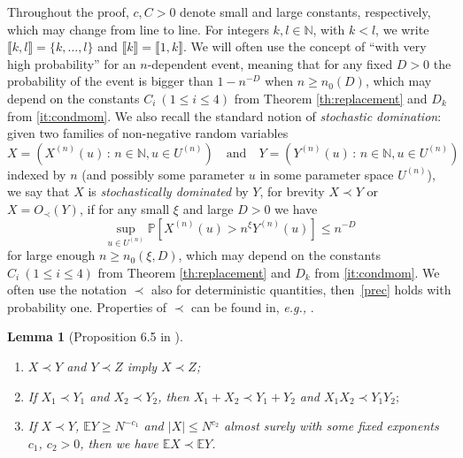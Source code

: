\documentclass[10pt,reqno]{amsart}
\numberwithin{equation}{section}
\numberwithin{figure}{section}
\theoremstyle{plain}
\newtheorem{lemma}[theorem]{Lemma}
\newcommand{\N}{{\mathbb{N}}}
\newcommand{\<}{\langle}
\renewcommand{\>}{\rangle}
\newcommand{\E}{\mathbb{E}}
\newcommand{\eg}{\emph{e.g., }}
\begin{document}
Throughout the proof, $c,C>0$ denote small and large constants, respectively, which may change from line to line.  For integers $k,l\in\N$, with $k<l$, we write 
$\llbracket k,l \rrbracket= \{k,\dots, l\}$ and 
$\llbracket k \rrbracket=
\llbracket 1,k \rrbracket$.  
We will often use the concept of ``with very high probability'' for an $n$-dependent event, meaning that for any fixed $D>0$ the probability of the event is bigger than $1-n^{-D}$ when $n\ge n_0(D)$, which may depend on the constants $C_i~(1\leq i\leq 4)$ from Theorem \ref{th:replacement} and $D_k$ from \ref{it:condmom}. We also recall the standard notion of \emph{stochastic domination}:  
given two families of non-negative random variables
\[
X=\left(X^{(n)}(u) \,:\, n\in\N, u\in U^{(n)}\right)\quad\text{and}\quad Y=\left(Y^{(n)}(u) \,:\, n\in\N, u\in U^{(n)}\right)
\] 
indexed by $n$ (and possibly some parameter $u$  in some parameter space $U^{(n)}$), 
we say that $X$ is {\it stochastically dominated} by $Y$, for brevity $X\prec Y$ or $X= O_\prec(Y)$, if for any small $\xi$ and large $D>0$ we have 
\begin{equation}
	\label{prec}
	\sup_{u\in U^{(n)}} \mathbb{P}\left[X^{(n)}(u)>n^\xi  Y^{(n)}(u)\right]\le n^{-D}
\end{equation}
for large enough $n\geq n_0(\xi,D)$, which may depend on the constants $C_i~(1\leq i\leq 4)$ from Theorem \ref{th:replacement} and $D_k$ from \ref{it:condmom}. 
%
%
We often use the notation $\prec$ also for deterministic quantities, then~\eqref{prec} holds with probability one. 
Properties of $\prec$ can be found in, \eg \cite[Proposition 6.5]{zbMATH06780221}.
\begin{lemma}[Proposition 6.5 in \cite{zbMATH06780221}]\label{lemma_dominant}\ %
	\begin{enumerate}
		\item $X \prec Y$ and $Y \prec Z$ imply $X \prec Z$;
		\item If $X_1 \prec Y_1$ and $X_2 \prec Y_2$, then $X_1+X_2 \prec Y_1+Y_2$ and $X_1X_2 \prec Y_1Y_2;$
		\item If $X \prec Y$, $\E Y \geq N^{-c_1}$ and $|X| \leq N^{c_2}$ almost surely with some fixed exponents $c_1$, $c_2>0$, then we have $\E X \prec \E Y$.
	\end{enumerate}
\end{lemma} 

\medskip
\end{document}
